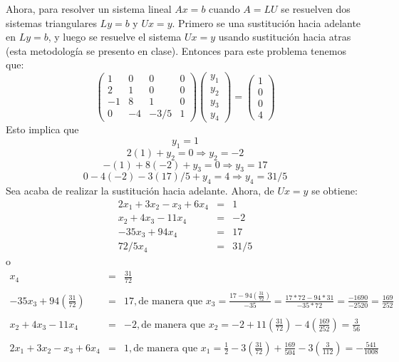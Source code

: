 \documentclass[11pt,letterpaper]{article}
\begin{document}
\begin{enumerate}
\begin{equation*}
\end{equation*}
Ahora, para resolver un sistema lineal $Ax=b$ cuando $A=LU$ se resuelven dos sistemas triangulares $Ly=b$ y $Ux=y.$ Primero se una sustitución hacia adelante en $Ly=b$, y luego se resuelve el sistema $Ux=y$ usando sustitución hacia atras (esta metodología se presento en clase). Entonces para este problema tenemos que:
\begin{equation*}
\left(\begin{array}{rrrr}
 1 &  0 &  0 & 0\\
 2 &  1 &  0 & 0\\
-1 &  8 &  1 & 0\\
 0 &  -4 & -3/5 & 1
\end{array} \right) \begin{pmatrix}
y_1\\
y_2\\
y_3\\
y_4
\end{pmatrix}= \begin{pmatrix}
1\\
0\\
0\\
4
\end{pmatrix}
\end{equation*}
Esto implica que 
$$y_1=1$$
$$2(1)+y_2=0\Rightarrow y_2=-2$$
$$-(1)+8(-2)+y_3=0\Rightarrow y_3=17$$
$$0-4(-2)-3(17)/5+y_4=4\Rightarrow y_4=31/5$$
Sea acaba de realizar la sustitución hacia adelante. Ahora, de $Ux=y$ se obtiene:
\begin{equation*}
\begin{array}{rcr}
2x_1+3x_2-x_3+6x_4&=&1\\
x_2+4x_3-11x_4&=&-2\\
-35x_3 +94x_4 &=&17\\
72/5x_4&=&31/5
\end{array}
\end{equation*}
o
\begin{equation*}
\begin{array}{lll}
x_4&=&\frac{31}{72}\\ \\
-35x_3 +94(\frac{31}{72}) &=&17,\text{de manera que } x_3=\frac{17-94\left(\frac{31}{72}\right)}{-35}=\frac{17*72-94*31}{-35*72}=\frac{-1690}{-2520}=\frac{169}{252}\\ \\
x_2+4x_3-11x_4&=&-2, \text{de manera que } x_2=-2+11\left(\frac{31}{72}\right) -4\left(\frac{169}{252}\right)=\frac{3}{56}\\ \\
2x_1+3x_2-x_3+6x_4&=&1, \text{de manera que } x_1=\frac{1}{2}-3\left(\frac{31}{72}\right) + \frac{169}{504}-3\left( \frac{3}{112} \right)=-\frac{541}{1008}\\
\end{array}
\end{equation*}


\end{enumerate}
\end{document}
